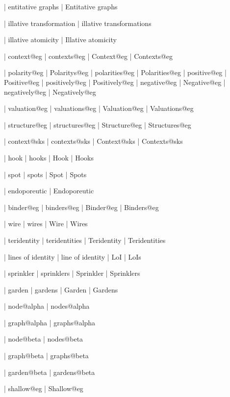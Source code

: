  | entitative graphs
 | Entitative graphs

 | illative transformation
 | illative transformations

 | illative atomicity
 | Illative atomicity
 
 | context@eg
 | contexts@eg
 | Context@eg
 | Contexts@eg

 | polarity@eg
 | Polaritys@eg
 | polarities@eg
 | Polarities@eg
 | positive@eg
 | Positive@eg
 | positively@eg
 | Positively@eg
 | negative@eg
 | Negative@eg
 | negatively@eg
 | Negatively@eg

 | valuation@eg
 | valuations@eg
 | Valuation@eg
 | Valuations@eg

 | structure@eg
 | structures@eg
 | Structure@eg
 | Structures@eg

 | context@sks
 | contexts@sks
 | Context@sks
 | Contexts@sks

 | hook
 | hooks
 | Hook
 | Hooks

 | spot
 | spots
 | Spot
 | Spots
 
 | endoporeutic
 | Endoporeutic

 | binder@eg
 | binders@eg
 | Binder@eg
 | Binders@eg

 | wire
 | wires
 | Wire
 | Wires

 | teridentity
 | teridentities
 | Teridentity
 | Teridentities

 | lines of identity
 | line of identity
 | LoI
 | LoIs

 | sprinkler
 | sprinklers
 | Sprinkler
 | Sprinklers

 | garden
 | gardens
 | Garden
 | Gardens

 | node@alpha
 | nodes@alpha

 | graph@alpha
 | graphs@alpha

 | node@beta
 | nodes@beta

 | graph@beta
 | graphs@beta

 | garden@beta
 | gardens@beta

 | shallow@eg
 | Shallow@eg

